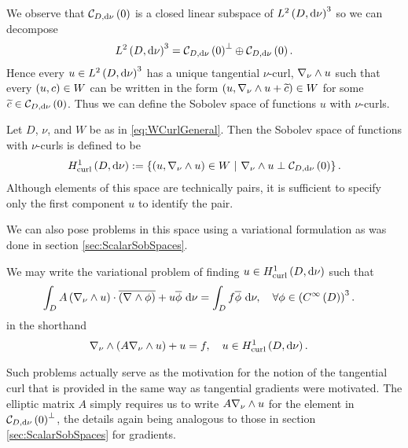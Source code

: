 We observe that $\mathcal{C}_{ D, \mathrm{d}\nu}\left( 0 \right)$ is a closed linear subspace of $L^{2}\left( D,\mathrm{d}\nu \right)^3$ so we can decompose
\begin{align*}
	L^{2}\left( D,\mathrm{d}\nu \right)^3 = \mathcal{C}_{ D, \mathrm{d}\nu}\left( 0 \right)^\perp \oplus \mathcal{C}_{ D, \mathrm{d}\nu}\left( 0 \right).
\end{align*}
Hence every $u\in L^{2}\left( D,\mathrm{d}\nu \right)^3$ has a unique tangential $\nu$-curl, $\nabla_{\nu}\wedge u$ such that every $\left( u,c \right)\in W$ can be written in the form $\left( u, \nabla_{\nu}\wedge u + \widetilde{c} \right)\in W$ for some $\widetilde{c}\in\mathcal{C}_{ D, \mathrm{d}\nu}\left( 0 \right)$.
Thus we can define the Sobolev space of functions $u$ with $\nu$-curls.
\begin{definition}
	Let $D$, $\nu$, and $W$ be as in \eqref{eq:WCurlGeneral}.
	Then the Sobolev space of functions with $\nu$-curls is defined to be
	\begin{align*}
	\curlSob{D}{\nu} := \clbracs{ \bracs{u,\curl{\nu}u}\in W \ \vert \ \curl{\nu}u \perp \curlZero{D}{\nu} }.
\end{align*}
	Although elements of this space are technically pairs, it is sufficient to specify only the first component $u$ to identify the pair.
\end{definition}
We can also pose problems in this space using a variational formulation as was done in section \ref{sec:ScalarSobSpaces}.
\begin{convention} \label{conv:VariationalShorthandCurls}
We may write the variational problem of finding $u\in H^1_\mathrm{curl}\left( D, \mathrm{d}\nu \right)$ such that
\begin{align*}
	\int_{D} A\left( \nabla_{\nu}\wedge u \right)\cdot\overline{\left( \nabla_{}\wedge\phi \right)} + u\overline{\phi} \ \mathrm{d}\nu &= \int_{D} f\overline{\phi}  \ \mathrm{d}\nu, \quad \forall\phi\in\left( C^{\infty}\left( D \right) \right)^3.
\end{align*}
in the shorthand
\begin{align*}
	\nabla_{\nu}\wedge\left( A\nabla_{\nu}\wedge u \right) + u &= f, \quad u\in H^1_\mathrm{curl}\left( D, \mathrm{d}\nu \right).
\end{align*}
\end{convention}
Such problems actually serve as the motivation for the notion of the tangential curl that is provided in the same way as tangential gradients were motivated.
The elliptic matrix $A$ simply requires us to write $A\nabla_{\nu}\wedge u$ for the element in $\mathcal{C}_{ D, \mathrm{d}\nu}\left( 0 \right)^\perp$, the details again being analogous to those in section \ref{sec:ScalarSobSpaces} for gradients. \newline

